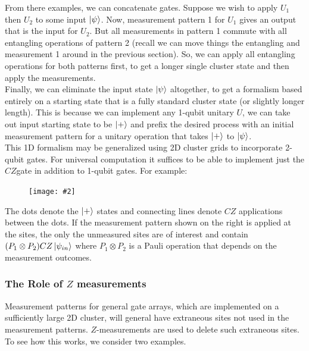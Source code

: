 \documentclass{book}
\theoremstyle{definition}
\newcommand{\fig}[2]{
	\begin{figure}[!htb]
		\centering
		\texttt{[image: \#2]}
	\end{figure}}
\begin{document}
From there examples, we can concatenate gates. Suppose we wish to apply $U_1$ then $U_2$ to some input $\ket{\psi}$. Now, measurement pattern 1 for $U_1$ gives an output that is the input for $U_2$. But all measurements in pattern 1 commute with all entangling operations of pattern 2 (recall we can move things the entangling and measurement 1 around in the previous section). So, we can apply all entangling operations for both patterns first, to get a longer single cluster state and then apply the measurements.\\


Finally, we can eliminate the input state $\ket{\psi}$ altogether, to get a formalism based entirely on a starting state that is a fully standard cluster state (or slightly longer length). This is because we can implement any 1-qubit unitary $U$, we can take out input starting state to be $\ket{+}$ and prefix the desired process with an initial measurement pattern for a unitary operation that takes $\ket{+}$ to $\ket{\psi}$.\\

This 1D formalism may be generalized using 2D cluster grids to incorporate 2-qubit gates. For universal computation it suffices to be able to implement just the $CZ$gate in addition to 1-qubit gates. For example:

\fig{0.3}{fig8}

The dots denote the $\ket{+}$ states and connecting lines denote $CZ$ applications between the dots. If the measurement pattern shown on the right is applied at the sites, the only the unmeasured sites are of interest and contain $(P_1 \otimes P_2)CZ\ket{\psi_{in}}$ where $P_1 \otimes P_2$ is a Pauli operation that depends on the measurement outcomes. 


\subsubsection{The Role of $Z$ measurements}

Measurement patterns for general gate arrays, which are implemented on a sufficiently large 2D cluster, will general have extraneous sites not used in the measurement patterns. $Z$-measurements are used to delete such extraneous sites. To see how this works, we consider two examples. 
\end{document}
